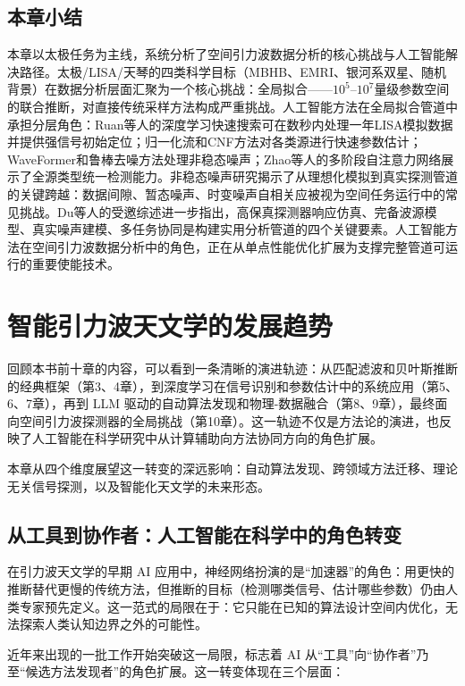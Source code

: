 \section{本章小结}

本章以太极任务为主线，系统分析了空间引力波数据分析的核心挑战与人工智能解决路径。太极/LISA/天琴的四类科学目标（MBHB、EMRI、银河系双星、随机背景）在数据分析层面汇聚为一个核心挑战：全局拟合——$10^5$--$10^7$量级参数空间的联合推断，对直接传统采样方法构成严重挑战。人工智能方法在全局拟合管道中承担分层角色：Ruan等人的深度学习快速搜索可在数秒内处理一年LISA模拟数据并提供强信号初始定位；归一化流和CNF方法对各类源进行快速参数估计；WaveFormer和鲁棒去噪方法处理非稳态噪声；Zhao等人的多阶段自注意力网络展示了全源类型统一检测能力。非稳态噪声研究揭示了从理想化模拟到真实探测管道的关键跨越：数据间隙、暂态噪声、时变噪声自相关应被视为空间任务运行中的常见挑战。Du等人的受邀综述进一步指出，高保真探测器响应仿真、完备波源模型、真实噪声建模、多任务协同是构建实用分析管道的四个关键要素。人工智能方法在空间引力波数据分析中的角色，正在从单点性能优化扩展为支撑完整管道可运行的重要使能技术。

\chapter{智能引力波天文学的发展趋势}

回顾本书前十章的内容，可以看到一条清晰的演进轨迹：从匹配滤波和贝叶斯推断的经典框架（第3、4章），到深度学习在信号识别和参数估计中的系统应用（第5、6、7章），再到 LLM 驱动的自动算法发现和物理-数据融合（第8、9章），最终面向空间引力波探测器的全局挑战（第10章）。这一轨迹不仅是方法论的演进，也反映了人工智能在科学研究中从计算辅助向方法协同方向的角色扩展。

本章从四个维度展望这一转变的深远影响：自动算法发现、跨领域方法迁移、理论无关信号探测，以及智能化天文学的未来形态。

\section{从工具到协作者：人工智能在科学中的角色转变}

在引力波天文学的早期 AI 应用中，神经网络扮演的是“加速器”的角色：用更快的推断替代更慢的传统方法，但推断的目标（检测哪类信号、估计哪些参数）仍由人类专家预先定义。这一范式的局限在于：它只能在已知的算法设计空间内优化，无法探索人类认知边界之外的可能性。

近年来出现的一批工作开始突破这一局限，标志着 AI 从“工具”向“协作者”乃至“候选方法发现者”的角色扩展。这一转变体现在三个层面：

